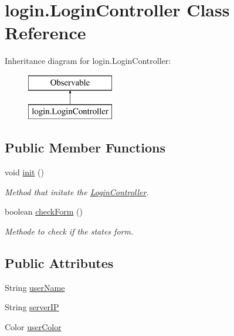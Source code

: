 \hypertarget{classlogin_1_1_login_controller}{}\section{login.\+Login\+Controller Class Reference}
\label{classlogin_1_1_login_controller}
Inheritance diagram for login.\+Login\+Controller\+:\begin{figure}[H]
\begin{center}
\leavevmode
\includegraphics[height=2.000000cm]{classlogin_1_1_login_controller}
\end{center}
\end{figure}
\subsection*{Public Member Functions}
\begin{DoxyCompactItemize}
\item 
void \hyperlink{classlogin_1_1_login_controller_aad48ea189ef89f216cd9baa8a045a792}{init} ()
\begin{DoxyCompactList}\small\item\em Method that initate the \hyperlink{classlogin_1_1_login_controller}{Login\+Controller}. \end{DoxyCompactList}\item 
boolean \hyperlink{classlogin_1_1_login_controller_ace34b5fc7aaed7dad451c7bd4f18360b}{check\+Form} ()
\begin{DoxyCompactList}\small\item\em Methode to check if the state\textquotesingle{}s form. \end{DoxyCompactList}\end{DoxyCompactItemize}
\subsection*{Public Attributes}
\begin{DoxyCompactItemize}
\item 
String \hyperlink{classlogin_1_1_login_controller_aca2945118c790e029183a46347154ee3}{user\+Name}
\item 
String \hyperlink{classlogin_1_1_login_controller_abe699936676f2262b822fe0dcafd35b1}{server\+IP}
\item 
Color \hyperlink{classlogin_1_1_login_controller_a081ea0de3603e343739a9c123b52e622}{user\+Color}
\end{DoxyCompactItemize}


